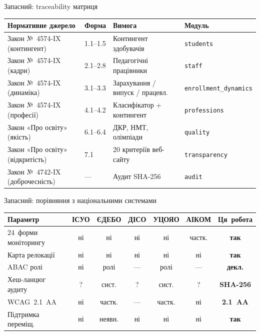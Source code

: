 \documentclass[14pt,aspectratio=169]{beamer}
\begin{document}
\begin{frame}{Запасний: traceability матриця}
\centering\tiny
\begin{tabular}{|p{3.2cm}|p{1.5cm}|p{2.5cm}|p{2cm}|}
\hline
\textbf{Нормативне джерело} & \textbf{Форма} & \textbf{Вимога} & \textbf{Модуль} \\
\hline
Закон №~4574-IX (контингент) & 1.1--1.5 & Контингент здобувачів & \texttt{students} \\
\hline
Закон №~4574-IX (кадри) & 2.1--2.8 & Педагогічні працівники & \texttt{staff} \\
\hline
Закон №~4574-IX (динаміка) & 3.1--3.3 & Зарахування / випуск / працевл. & \texttt{enrollment\_dynamics} \\
\hline
Закон №~4574-IX (професії) & 4.1--4.2 & Класифікатор + контингент & \texttt{professions} \\
\hline
Закон «Про освіту» (якість) & 6.1--6.4 & ДКР, НМТ, олімпіади & \texttt{quality} \\
\hline
Закон «Про освіту» (відкритість) & 7.1 & 20 критеріїв веб-сайту & \texttt{transparency} \\
\hline
Закон №~4742-IX (доброчесність) & --- & Аудит SHA-256 & \texttt{audit} \\
\hline
\end{tabular}
\end{frame}

\begin{frame}{Запасний: порівняння з національними системами}
\centering\tiny
\begin{tabular}{|l|c|c|c|c|c|c|}
\hline
\textbf{Параметр} & \textbf{ІСУО} & \textbf{ЄДЕБО} & \textbf{ДІСО} & \textbf{УЦОЯО} & \textbf{АІКОМ} & \textbf{Ця~робота} \\
\hline
24~форми моніторингу & ні & ні & ні & ні & частк. & \textbf{так} \\
\hline
Карта релокації & ні & ні & ні & ні & ні & \textbf{так} \\
\hline
ABAC ролі & ні & ролі & --- & ролі & --- & \textbf{декл.} \\
\hline
Хеш-ланцюг аудиту & ? & сист. & ? & сист. & ? & \textbf{SHA-256} \\
\hline
WCAG~2.1~AA & ні & частк. & --- & частк. & ні & \textbf{2.1~AA} \\
\hline
Підтримка переміщ. & ні & неявн. & ні & ні & ні & \textbf{так} \\
\hline
\end{tabular}
\end{frame}
\end{document}
